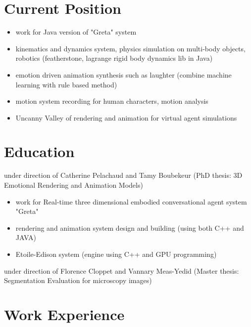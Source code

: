 \section{Current Position}
{
\begin{itemize}
	\item work for Java version of "Greta" system
	\item kinematics and dynamics system, physics simulation on multi-body objects, robotics (featherstone, lagrange rigid body dynamics lib in Java)
	\item emotion driven animation synthesis such as laughter (combine machine learning with rule based method)
	\item motion system recording for human characters, motion analysis
	\item Uncanny Valley of rendering and animation for virtual agent simulations
\end{itemize}
}


\section{Education}
{under direction of Catherine Pelachaud and Tamy Boubekeur (PhD thesis: 3D Emotional Rendering and Animation Models)
\begin{itemize}
	\item work for Real-time three dimensional embodied conversational agent system "Greta"
	\item rendering and animation system design and building (using both C++ and JAVA)
	\item Etoile-Edison system (engine using C++ and GPU programming)
\end{itemize}
}  %

{under direction of Florence Cloppet and Vannary Meas-Yedid (Master thesis: Segmentation Evaluation for microscopy images)
}


\section{Work Experience}

